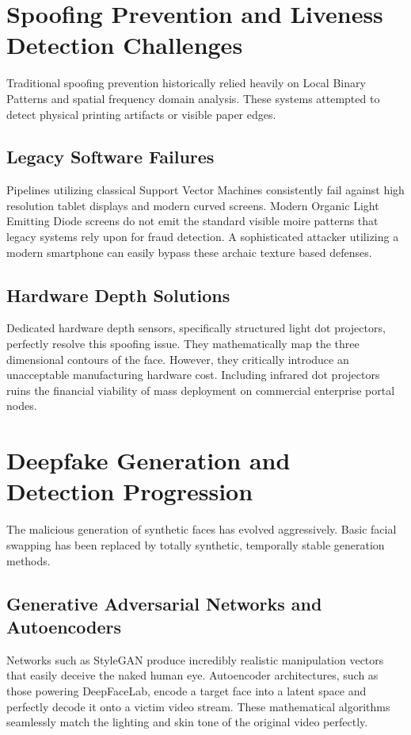 \documentclass[12pt,a4paper]{report}
\begin{document}
\section{Spoofing Prevention and Liveness Detection Challenges}
Traditional spoofing prevention historically relied heavily on Local Binary Patterns and spatial frequency domain analysis. These systems attempted to detect physical printing artifacts or visible paper edges.

\subsection{Legacy Software Failures}
Pipelines utilizing classical Support Vector Machines consistently fail against high resolution tablet displays and modern curved screens. Modern Organic Light Emitting Diode screens do not emit the standard visible moire patterns that legacy systems rely upon for fraud detection. A sophisticated attacker utilizing a modern smartphone can easily bypass these archaic texture based defenses.

\subsection{Hardware Depth Solutions}
Dedicated hardware depth sensors, specifically structured light dot projectors, perfectly resolve this spoofing issue. They mathematically map the three dimensional contours of the face. However, they critically introduce an unacceptable manufacturing hardware cost. Including infrared dot projectors ruins the financial viability of mass deployment on commercial enterprise portal nodes.

\section{Deepfake Generation and Detection Progression}
The malicious generation of synthetic faces has evolved aggressively. Basic facial swapping has been replaced by totally synthetic, temporally stable generation methods.

\subsection{Generative Adversarial Networks and Autoencoders}
Networks such as StyleGAN produce incredibly realistic manipulation vectors that easily deceive the naked human eye. Autoencoder architectures, such as those powering DeepFaceLab, encode a target face into a latent space and perfectly decode it onto a victim video stream. These mathematical algorithms seamlessly match the lighting and skin tone of the original video perfectly.
\end{document}
